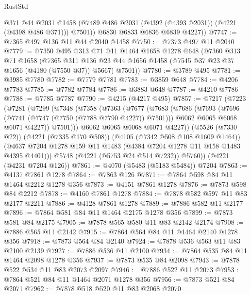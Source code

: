 \begin{lexlean}{RustStd}
\begin{coremodule}
{\begin{coremodule}
{{{{{{{{{{{{{{{{{{{{{{{{{{{{{{{            @371
            @44
            @2031
            @1458
            (@7489 @486 @2031 (@4392 (@4393 @2031)) (@4221 (@4398 @486 @371)))
            @7501))
        @6830
        @6833
        @6836
        @6839
        @4227))
@7747 := @7365 @497 @136 @11 @44 @2040 @1458
@7750 := @7373 @497 @11 @2040
@7779 := @7350
    @495
    @313
    @71
    @11
    @1464
    @1658
    @1278
    @648
    (@7360
      @313
      @71
      @1658
      (@7365
        @311
        @136
        @23
        @44
        @1656
        @1458
        (@7545 @37 @23 @37 @1656 (@4180 (@7550 @37)) @5667)
        @7501))
@7780 := @3789 @495
@7781 := @3985 @7780
@7782 := @7779 @7781
@7783 := @3859 @648
@7784 := @4206 @7783
@7785 := @7782 @7784
@7786 := @3883 @648
@7787 := @4210 @7786
@7788 := @7785 @7787
@7790 := @4215 (@4217 @495)
@7857 := @7217
    (@7223
      (@7281
        (@7299
          (@7348
            (@7358
              (@7363
                (@7677
                  (@7683
                    (@7686
                      (@7693
                        (@7696 (@7741 (@7747 (@7750 (@7788 @7790 @4227)) @7501)))
                        @6062
                        @6065
                        @6068
                        @6071
                        @4227))
                    @7501)))
              @6062
              @6065
              @6068
              @6071
              @4227))
          (@5526 (@7330 @22))
          (@4221 (@7335 @170 @508))
          (@4105 (@7342 @508 @108 @1609 @1464))
          (@4637 @7204 @1278 @159 @11 @1483 (@4384 @7204 @1278 @11 @158 @1483 @4395 @4401)))
        @5748
        (@4221 (@5753 @24 @514 @7232))
        @5760))
    (@4221 (@4231 @7204 @126))
@7861 := @4070 (@5483 (@5183 @5484)) @7204
@7863 := @4137 @7861 @1278
@7864 := @7863 @126
@7871 := @7864 @598 @84 @11 @1464 @2212 @1278 @356
@7873 := @4151 @7861 @1278
@7876 := @7873 @598 @84 @2212
@7878 := @4160 @7861 @1278
@7884 := @7878 @582 @597 @11 @83 @2177 @2211
@7886 := @4128 @7861 @1278
@7889 := @7886 @582 @11 @2177
@7896 := @7864 @581 @84 @11 @1464 @2175 @1278 @356
@7899 := @7873 @581 @84 @2175
@7905 := @7878 @565 @580 @11 @83 @2142 @2174
@7908 := @7886 @565 @11 @2142
@7915 := @7864 @564 @84 @11 @1464 @2140 @1278 @356
@7918 := @7873 @564 @84 @2140
@7924 := @7878 @536 @563 @11 @83 @2100 @2139
@7927 := @7886 @536 @11 @2100
@7934 := @7864 @535 @84 @11 @1464 @2098 @1278 @356
@7937 := @7873 @535 @84 @2098
@7943 := @7878 @522 @534 @11 @83 @2073 @2097
@7946 := @7886 @522 @11 @2073
@7953 := @7864 @521 @84 @11 @1464 @2071 @1278 @356
@7956 := @7873 @521 @84 @2071
@7962 := @7878 @518 @520 @11 @83 @2068 @2070
}}}}}}}}}}}}}}}}}}}}}}}}}}}}}}}
\end{coremodule}}
\end{coremodule}
\end{lexlean}
